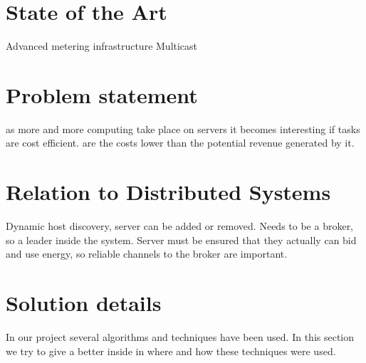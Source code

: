 \documentclass[10pt]{article} %
\begin{document}
\section{State of the Art}

Advanced metering infrastructure
Multicast  

\section{Problem statement}

as more and more computing take place on servers it becomes interesting if tasks are cost efficient. are the costs lower than the potential revenue generated by it. 

\section{Relation to Distributed Systems}

Dynamic host discovery, server can be added or removed. 
Needs to be a broker, so a leader inside the system. 
Server must be ensured that they actually can bid and use energy, so reliable channels to the broker are important.

\section{Solution details}
In our project several algorithms and techniques have been used. In this section we try to give a better inside in where and how these techniques were used.
\end{document}
